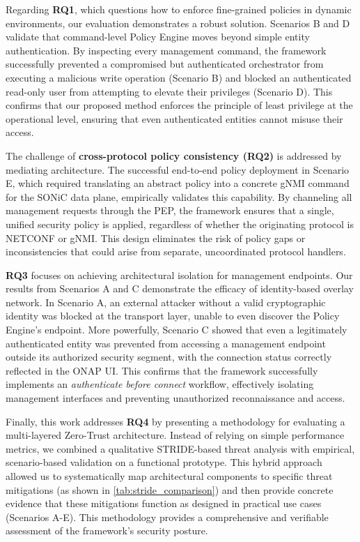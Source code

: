 \documentclass[12pt, a4paper, reqno, oneside]{book}
\begin{document}
Regarding \textbf{RQ1}, which questions how to enforce fine-grained policies in dynamic environments, our evaluation demonstrates a robust solution. Scenarios B and D validate that command-level Policy Engine moves beyond simple entity authentication. By inspecting every management command, the framework successfully prevented a compromised but authenticated orchestrator from executing a malicious write operation (Scenario B) and blocked an authenticated read-only user from attempting to elevate their privileges (Scenario D). This confirms that our proposed method enforces the principle of least privilege at the operational level, ensuring that even authenticated entities cannot misuse their access.

The challenge of \textbf{cross-protocol policy consistency (RQ2)} is addressed by mediating architecture. The successful end-to-end policy deployment in Scenario E, which required translating an abstract policy into a concrete gNMI command for the SONiC data plane, empirically validates this capability. By channeling all management requests through the PEP, the framework ensures that a single, unified security policy is applied, regardless of whether the originating protocol is NETCONF or gNMI. This design eliminates the risk of policy gaps or inconsistencies that could arise from separate, uncoordinated protocol handlers.

\textbf{RQ3} focuses on achieving architectural isolation for management endpoints. Our results from Scenarios A and C demonstrate the efficacy of identity-based overlay network. In Scenario A, an external attacker without a valid cryptographic identity was blocked at the transport layer, unable to even discover the Policy Engine's endpoint. More powerfully, Scenario C showed that even a legitimately authenticated entity was prevented from accessing a management endpoint outside its authorized security segment, with the connection status correctly reflected in the ONAP UI. This confirms that the framework successfully implements an \textit{authenticate before connect} workflow, effectively isolating management interfaces and preventing unauthorized reconnaissance and access.

Finally, this work addresses \textbf{RQ4} by presenting a methodology for evaluating a multi-layered Zero-Trust architecture. Instead of relying on simple performance metrics, we combined a qualitative STRIDE-based threat analysis with empirical, scenario-based validation on a functional prototype. This hybrid approach allowed us to systematically map architectural components to specific threat mitigations (as shown in \autoref{tab:stride_comparison}) and then provide concrete evidence that these mitigations function as designed in practical use cases (Scenarios A-E). This methodology provides a comprehensive and verifiable assessment of the framework's security posture.
\end{document}
